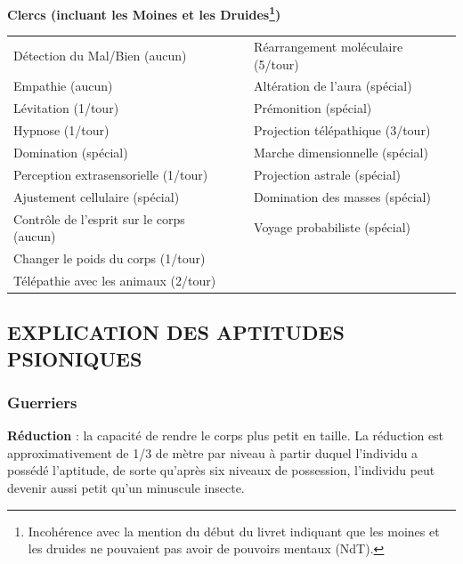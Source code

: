 {\bigskip

\textbf{Clercs (incluant les Moines et les Druides\footnote{Incohérence avec la mention du début du livret indiquant que les moines et les druides ne pouvaient pas avoir de pouvoirs mentaux (NdT).})}

\bigskip

\begin{tabular}{p{7.5cm}p{0.3cm}p{7.5cm}}
Détection du Mal/Bien (aucun) && Réarrangement moléculaire (5/tour) \\
Empathie (aucun) && Altération de l'aura (spécial) \\
Lévitation (1/tour) && Prémonition (spécial) \\
Hypnose (1/tour) && Projection télépathique (3/tour) \\
Domination (spécial) && Marche dimensionnelle (spécial) \\
Perception extrasensorielle (1/tour) && Projection astrale (spécial) \\
Ajustement cellulaire (spécial) && Domination des masses (spécial) \\
Contrôle de l'esprit sur le corps (aucun) &&  Voyage probabiliste (spécial) \\
Changer le poids du corps (1/tour) && \\
Télépathie avec les animaux (2/tour) && \\
\end{tabular}

\newpage
\subsection*{\normalsize EXPLICATION DES APTITUDES PSIONIQUES}

\subsubsection*{Guerriers}

\textbf{Réduction} : la capacité de rendre le corps plus petit en taille. La réduction est approximativement de 1/3 de mètre par niveau à partir duquel l'individu a possédé l'aptitude, de sorte qu'après six niveaux de possession, l'individu peut devenir aussi petit qu'un minuscule insecte.

}
